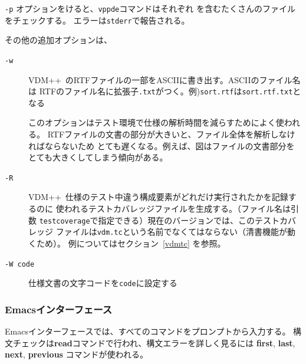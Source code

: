\documentclass[\pformat,12pt]{jarticle}
\newcommand{\vdmslpp}{VDM++}
\newcommand{\vdmde}{vppde}
\newcommand{\aaa}{\tt }
\begin{document}
\vspace{0.5cm}

\noindent

{\tt -p} オプションをけると、{\tt \vdmde}コマンドはそれぞれ
を含むたくさんのファイルをチェックする。
エラーは{\aaa stderr}で報告される。

その他の追加オプションは、

\begin{description}

\item[{\tt -w}]
   \vdmslpp\ のRTFファイルの一部をASCIIに書き出す。ASCIIのファイル名は
  RTFのファイル名に拡張子{\tt .txt}がつく。例){\tt sort.rtf}は{\tt sort.rtf.txt}となる

  このオプションはテスト環境で仕様の解析時間を減らすためによく使われる。
  RTFファイルの文書の部分が大きいと、ファイル全体を解析しなければならないため
  とても遅くなる。例えば、図はファイルの文書部分をとても大きくしてしまう傾向がある。

\item[{\tt -R}]
   \vdmslpp\ 仕様のテスト中違う構成要素がどれだけ実行されたかを記録するのに
  使われるテストカバレッジファイルを生成する。（ファイル名は引数
  {\tt testcoverage}で指定できる）現在のバージョンでは、このテストカバレッジ
  ファイルは{\tt vdm.tc}という名前でなくてはならない（清書機能が動くため）。
  例についてはセクション~\ref{vdmtc} を参照。

\item[{\tt -W code}] 仕様文書の文字コードを{\tt code}に設定する
\end{description}

\subsubsection{Emacsインターフェース}


Emacsインターフェースでは、すべてのコマンドをプロンプトから入力する。
構文チェックは\textbf{read}コマンドで行われ、構文エラーを詳しく見るには
\textbf{first}, \textbf{last}, \textbf{next}, \textbf{previous} コマンドが使われる。
\end{document}
